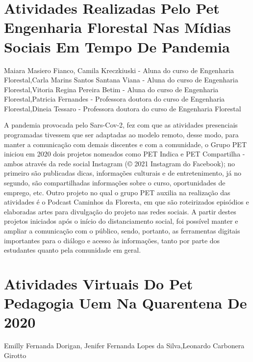 


\section*{Atividades Realizadas Pelo Pet Engenharia Florestal Nas Mídias Sociais Em Tempo De Pandemia}

Maiara Masiero Fianco, Camila Kreczkiuski - Aluna do curso de Engenharia Florestal,Carla Marins Santos Santana Viana - Aluna do curso de Engenharia Florestal,Vitoria Regina Pereira Betim - Aluna do curso de Engenharia Florestal,Patricia Fernandes - Professora doutora do curso de Engenharia Florestal,Dineia Tessaro - Professora doutora do curso de Engenharia Florestal

A pandemia provocada pelo Sars-Cov-2, fez com que as atividades presenciais programadas tivessem que ser adaptadas ao modelo remoto, desse modo, para manter a comunicação com demais discentes e com a comunidade, o Grupo PET iniciou em 2020 dois projetos nomeados como PET Indica e PET Compartilha - ambos através da rede social Instagram (© 2021 Instagram do Facebook); no primeiro são publicadas dicas, informações culturais e de entretenimento, já no segundo, são compartilhadas informações sobre o curso, oportunidades de emprego, etc. Outro projeto no qual o grupo PET auxilia na realização das atividades é o Podcast Caminhos da Floresta, em que são roteirizados episódios e elaboradas artes para divulgação do projeto nas redes sociais. A partir destes projetos iniciados após o início do distanciamento social, foi possível manter e ampliar a comunicação com o público, sendo, portanto, as ferramentas digitais importantes para o diálogo e acesso às informações, tanto por parte dos estudantes quanto pela comunidade em geral.




\section*{Atividades Virtuais Do Pet Pedagogia Uem Na Quarentena De 2020}

Emilly Fernanda Dorigan, Jenifer Fernanda Lopes da Silva,Leonardo Carbonera Girotto

